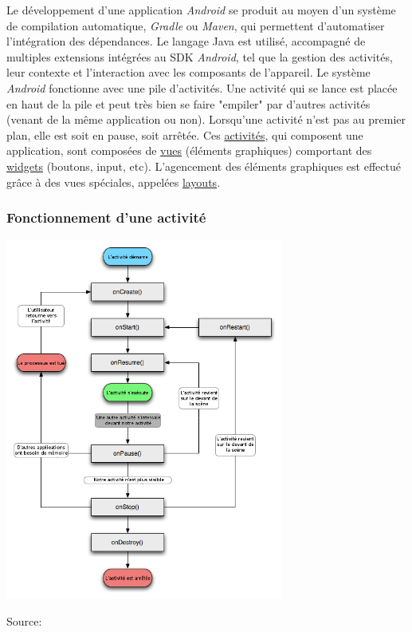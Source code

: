 Le développement d'une application \textit{Android} se produit au moyen d'un système de compilation automatique, \textit{Gradle} ou \textit{Maven}, qui permettent d'automatiser l'intégration des dépendances. Le langage Java est utilisé, accompagné de multiples extensions intégrées au SDK \textit{Android}, tel que la gestion des activités, leur contexte et l'interaction avec les composants de l'appareil. Le système \textit{Android} fonctionne avec une pile d'activités. Une activité qui se lance est placée en haut de la pile et peut très bien se faire "empiler" par d'autres activités (venant de la même application ou non). Lorsqu'une activité n'est pas au premier plan, elle est soit en pause, soit arrêtée. Ces \underline{activités}, qui composent une application, sont composées de \underline{vues} (éléments graphiques) comportant des \underline{widgets} (boutons, input, etc). L'agencement des éléments graphiques est effectué grâce à des vues spéciales, appelées \underline{layouts}.

\subsubsection{Fonctionnement d'une activité}

\begin{center}
\includegraphics[height=450px]{Assets/cycleActivit_.png}
\begin{flushleft}
\hspace*{15pt}\hbox{\scriptsize Source:}
\end{flushleft}

\label{cycleActivité}

\end{center}

